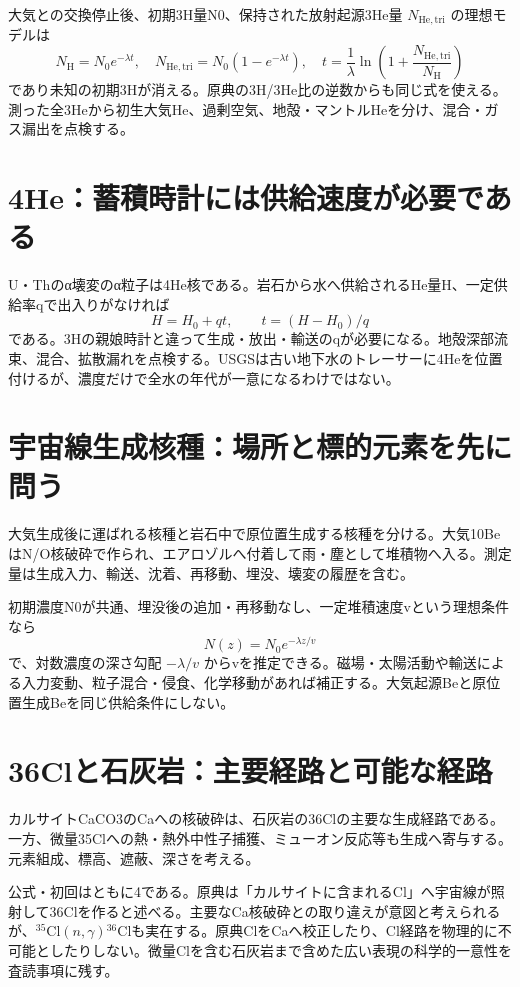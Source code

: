 大気との交換停止後、初期3H量N0、保持された放射起源3He量 \(N_{\mathrm{He,tri}}\) の理想モデルは
\[
 N_{\mathrm H}=N_0e^{-\lambda t},\quad
 N_{\mathrm{He,tri}}=N_0(1-e^{-\lambda t}),\quad
 t=\frac1\lambda\ln\left(1+\frac{N_{\mathrm{He,tri}}}{N_{\mathrm H}}\right)
\]
であり未知の初期3Hが消える。原典の3H/3He比の逆数からも同じ式を使える。測った全3Heから初生大気He、過剰空気、地殻・マントルHeを分け、混合・ガス漏出を点検する\cite{iso_tritium_clock}。

\section{4He：蓄積時計には供給速度が必要である}
\label{theory:isotope:helium}
U・Thのα壊変のα粒子は4He核である。岩石から水へ供給されるHe量H、一定供給率qで出入りがなければ
\[
 H=H_0+qt,\qquad t=(H-H_0)/q
\]
である。3Hの親娘時計と違って生成・放出・輸送のqが必要になる。地殻深部流束、混合、拡散漏れを点検する。USGSは古い地下水のトレーサーに4Heを位置付ける\cite{iso_groundwater}が、濃度だけで全水の年代が一意になるわけではない。

\section{宇宙線生成核種：場所と標的元素を先に問う}
\label{theory:isotope:cosmogenic}
大気生成後に運ばれる核種と岩石中で原位置生成する核種を分ける。大気10BeはN/O核破砕で作られ、エアロゾルへ付着して雨・塵として堆積物へ入る。測定量は生成入力、輸送、沈着、再移動、埋没、壊変の履歴を含む\cite{iso_be10}。

初期濃度N0が共通、埋没後の追加・再移動なし、一定堆積速度vという理想条件なら
\[
 N(z)=N_0e^{-\lambda z/v}
\]
で、対数濃度の深さ勾配 \(-\lambda/v\) からvを推定できる。磁場・太陽活動や輸送による入力変動、粒子混合・侵食、化学移動があれば補正する。大気起源Beと原位置生成Beを同じ供給条件にしない。

\section{36Clと石灰岩：主要経路と可能な経路}
\label{theory:isotope:cl36}
カルサイトCaCO3のCaへの核破砕は、石灰岩の36Clの主要な生成経路である。一方、微量35Clへの熱・熱外中性子捕獲、ミューオン反応等も生成へ寄与する。元素組成、標高、遮蔽、深さを考える\cite{iso_cl36,iso_cl36_uw}。

\begin{tcolorbox}[title=令和7年度問22：公式4と核反応の疑義]
公式・初回はともに4である。原典は「カルサイトに含まれるCl」へ宇宙線が照射して36Clを作ると述べる。主要なCa核破砕との取り違えが意図と考えられるが、\({}^{35}\mathrm{Cl}(n,\gamma){}^{36}\mathrm{Cl}\)も実在する。原典ClをCaへ校正したり、Cl経路を物理的に不可能としたりしない。微量Clを含む石灰岩まで含めた広い表現の科学的一意性を査読事項に残す。
\end{tcolorbox}

